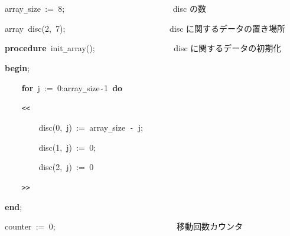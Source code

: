 \documentclass[a4paper,10pt]{article}
\def\mc{\relax}
\begin{document}
\noindent
\mbox{}array{\tt\_}size{\tt\mc \ }:={\tt\mc \ }8;{\tt\mc \ }{\tt\mc \ }{\tt\mc \ }{\tt\mc \ }{\tt\mc \ }{\tt\mc \ }{\tt\mc \ }{\tt\mc \ }{\tt\mc \ }{\tt\mc \ }{\tt\mc \ }{\tt\mc \ }{\tt\mc \ }{\tt\mc \ }{\tt\mc \ }{\tt\mc \ }{\tt\mc \ }{\tt\mc \ }{\tt\mc \ }{\tt\mc \ }{\tt\mc \ }{\tt\mc \ }{\tt\mc \ }{\tt\mc \ }\rm\mc {\tt\%} \ disc の数 \hfill
\tt\mc 

\noindent
\mbox{}\hfill

\noindent
\mbox{}array{\tt\mc \ }disc(2,{\tt\mc \ }7);{\tt\mc \ }{\tt\mc \ }{\tt\mc \ }{\tt\mc \ }{\tt\mc \ }{\tt\mc \ }{\tt\mc \ }{\tt\mc \ }{\tt\mc \ }{\tt\mc \ }{\tt\mc \ }{\tt\mc \ }{\tt\mc \ }{\tt\mc \ }{\tt\mc \ }{\tt\mc \ }{\tt\mc \ }{\tt\mc \ }{\tt\mc \ }{\tt\mc \ }{\tt\mc \ }{\tt\mc \ }{\tt\mc \ }\rm\mc {\tt\%} \ disc に関するデータの置き場所\hfill
\tt\mc 

\noindent
\mbox{}\hfill

\noindent
\mbox{}\textbf{procedure}{\tt\mc \ }init{\tt\_}array();{\tt\mc \ }{\tt\mc \ }{\tt\mc \ }{\tt\mc \ }{\tt\mc \ }{\tt\mc \ }{\tt\mc \ }{\tt\mc \ }{\tt\mc \ }{\tt\mc \ }{\tt\mc \ }{\tt\mc \ }{\tt\mc \ }{\tt\mc \ }{\tt\mc \ }{\tt\mc \ }{\tt\mc \ }\rm\mc {\tt\%} \ disc に関するデータの初期化\hfill
\tt\mc 

\noindent
\mbox{}\textbf{begin};

\noindent
\mbox{}{\tt\mc \ }{\tt\mc \ }{\tt\mc \ }{\tt\mc \ }\textbf{for}{\tt\mc \ }j{\tt\mc \ }:={\tt\mc \ }0:array{\tt\_}size{\tt -}1{\tt\mc \ }\textbf{do}

\noindent
\mbox{}{\tt\mc \ }{\tt\mc \ }{\tt\mc \ }{\tt\mc \ }{\tt <}{\tt <}

\noindent
\mbox{}{\tt\mc \ }{\tt\mc \ }{\tt\mc \ }{\tt\mc \ }{\tt\mc \ }{\tt\mc \ }{\tt\mc \ }{\tt\mc \ }disc(0,{\tt\mc \ }j){\tt\mc \ }:={\tt\mc \ }array{\tt\_}size{\tt\mc \ }{\tt -}{\tt\mc \ }j;

\noindent
\mbox{}{\tt\mc \ }{\tt\mc \ }{\tt\mc \ }{\tt\mc \ }{\tt\mc \ }{\tt\mc \ }{\tt\mc \ }{\tt\mc \ }disc(1,{\tt\mc \ }j){\tt\mc \ }:={\tt\mc \ }0;

\noindent
\mbox{}{\tt\mc \ }{\tt\mc \ }{\tt\mc \ }{\tt\mc \ }{\tt\mc \ }{\tt\mc \ }{\tt\mc \ }{\tt\mc \ }disc(2,{\tt\mc \ }j){\tt\mc \ }:={\tt\mc \ }0

\noindent
\mbox{}{\tt\mc \ }{\tt\mc \ }{\tt\mc \ }{\tt\mc \ }{\tt >}{\tt >}

\noindent
\mbox{}\textbf{end};

\noindent
\mbox{}\hfill

\noindent
\mbox{}counter{\tt\mc \ }:={\tt\mc \ }0;{\tt\mc \ }{\tt\mc \ }{\tt\mc \ }{\tt\mc \ }{\tt\mc \ }{\tt\mc \ }{\tt\mc \ }{\tt\mc \ }{\tt\mc \ }{\tt\mc \ }{\tt\mc \ }{\tt\mc \ }{\tt\mc \ }{\tt\mc \ }{\tt\mc \ }{\tt\mc \ }{\tt\mc \ }{\tt\mc \ }{\tt\mc \ }{\tt\mc \ }{\tt\mc \ }{\tt\mc \ }{\tt\mc \ }{\tt\mc \ }{\tt\mc \ }{\tt\mc \ }{\tt\mc \ }\rm\mc {\tt\%} \ 移動回数カウンタ \hfill
\tt\mc 
\end{document}
